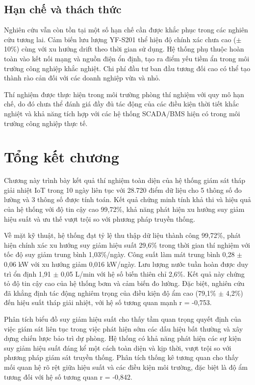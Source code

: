 \documentclass[../main.tex]{subfiles}
\begin{document}
\subsection{Hạn chế và thách thức}
\label{sec:limitations_challenges}

Nghiên cứu vẫn còn tồn tại một số hạn chế cần được khắc phục trong các nghiên cứu tương lai. Cảm biến lưu lượng YF-S201 thể hiện độ chính xác chưa cao ($\pm$10\%) cùng với xu hướng drift theo thời gian sử dụng. Hệ thống phụ thuộc hoàn toàn vào kết nối mạng và nguồn điện ổn định, tạo ra điểm yếu tiềm ẩn trong môi trường công nghiệp khắc nghiệt. Chi phí đầu tư ban đầu tương đối cao có thể tạo thành rào cản đối với các doanh nghiệp vừa và nhỏ.

Thí nghiệm được thực hiện trong môi trường phòng thí nghiệm với quy mô hạn chế, do đó chưa thể đánh giá đầy đủ tác động của các điều kiện thời tiết khắc nghiệt và khả năng tích hợp với các hệ thống SCADA/BMS hiện có trong môi trường công nghiệp thực tế.

\section{Tổng kết chương}
\label{sec:chapter4_conclusion}

Chương này trình bày kết quả thí nghiệm toàn diện của hệ thống giám sát tháp giải nhiệt IoT trong 10 ngày liên tục với 28.720 điểm dữ liệu cho 5 thông số đo lường và 3 thông số được tính toán. Kết quả chứng minh tính khả thi và hiệu quả của hệ thống với độ tin cậy cao 99,72\%, khả năng phát hiện xu hướng suy giảm hiệu suất và ưu thế vượt trội so với phương pháp truyền thống.

Về mặt kỹ thuật, hệ thống đạt tỷ lệ thu thập dữ liệu thành công 99,72\%, phát hiện chính xác xu hướng suy giảm hiệu suất 29,6\% trong thời gian thí nghiệm với tốc độ suy giảm trung bình 1,03\%/ngày. Công suất làm mát trung bình 0,28 $\pm$ 0,06 kW với xu hướng giảm 0,016 kW/ngày. Lưu lượng nước tuần hoàn được duy trì ổn định 1,91 $\pm$ 0,05 L/min với hệ số biến thiên chỉ 2,6\%. Kết quả này chứng tỏ độ tin cậy cao của hệ thống bơm và cảm biến đo lường. Đặc biệt, nghiên cứu đã khẳng định tác động nghiêm trọng của điều kiện độ ẩm cao (79,1\% $\pm$ 4,2\%) đến hiệu suất tháp giải nhiệt, với hệ số tương quan mạnh r = -0,753.

Phân tích biểu đồ suy giảm hiệu suất cho thấy tầm quan trọng quyết định của việc giám sát liên tục trong việc phát hiện sớm các dấu hiệu bất thường và xây dựng chiến lược bảo trì dự phòng. Hệ thống có khả năng phát hiện các sự kiện suy giảm hiệu suất đáng kể một cách toàn diện và kịp thời, vượt trội so với phương pháp giám sát truyền thống. Phân tích thống kê tương quan cho thấy mối quan hệ rõ rệt giữa hiệu suất và các điều kiện môi trường, đặc biệt là độ ẩm tương đối với hệ số tương quan r = -0,842.
\end{document}
